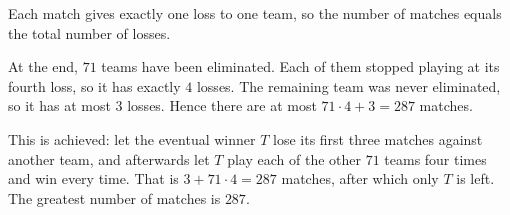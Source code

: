 Each match gives exactly one loss to one team, so the number of matches equals the total number of losses.

At the end, $71$ teams have been eliminated. Each of them stopped playing at its fourth loss, so it has exactly $4$ losses. The remaining team was never eliminated, so it has at most $3$ losses. Hence there are at most $71\cdot4+3=287$ matches.

This is achieved: let the eventual winner $T$ lose its first three matches against another team, and afterwards let $T$ play each of the other $71$ teams four times and win every time. That is $3+71\cdot4=287$ matches, after which only $T$ is left. The greatest number of matches is $\boxed{287}$.
